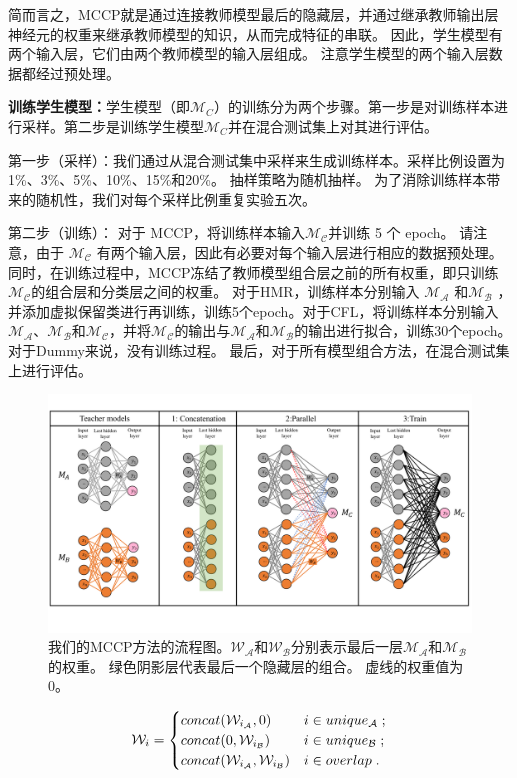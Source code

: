 \documentclass[fontset=macnew,UTF8]{article} %
\begin{document}
简而言之，MCCP就是通过连接教师模型最后的隐藏层，并通过继承教师输出层神经元的权重来继承教师模型的知识，从而完成特征的串联。 因此，学生模型有两个输入层，它们由两个教师模型的输入层组成。 注意学生模型的两个输入层数据都经过预处理。

\textbf{训练学生模型：}学生模型（即$\mathcal{M}_C$）的训练分为两个步骤。第一步是对训练样本进行采样。第二步是训练学生模型$\mathcal{M}_C$并在混合测试集上对其进行评估。

第一步（采样）：我们通过从混合测试集中采样来生成训练样本。采样比例设置为1\%、3\%、5\%、10\%、15\%和20\%\cite{shen2020multiple}。 抽样策略为随机抽样。 为了消除训练样本带来的随机性，我们对每个采样比例重复实验五次。

第二步（训练）： 对于 MCCP，将训练样本输入$\mathcal{M_C}$并训练 5 个 epoch。 请注意，由于 $\mathcal{M_C}$ 有两个输入层，因此有必要对每个输入层进行相应的数据预处理。 同时，在训练过程中，MCCP冻结了教师模型组合层之前的所有权重，即只训练$\mathcal{M_C}$的组合层和分类层之间的权重。 对于HMR，训练样本分别输入 $\mathcal{M_A}$ 和$\mathcal{M_B}$ ，并添加虚拟保留类进行再训练，训练5个epoch。对于CFL，将训练样本分别输入$\mathcal{M_A}$、$\mathcal{M_B}$和$\mathcal{M_C}$，并将$\mathcal{M_C}$的输出与$\mathcal{M_A}$和$\mathcal{M_B}$的输出进行拟合，训练30个epoch。 对于Dummy来说，没有训练过程。 最后，对于所有模型组合方法，在混合测试集上进行评估。
\begin{figure}[t]
	\centering
	\includegraphics[scale=0.4]{MCCP_method.pdf}
	\caption{我们的MCCP方法的流程图。$\mathcal{W_A}$和$\mathcal{W_B}$分别表示最后一层$\mathcal{M_A}$和$\mathcal{M_B}$的权重。 绿色阴影层代表最后一个隐藏层的组合。 虚线的权重值为 0。}	
	\label{MCCP_method}
\end{figure}

\begin{equation}
	\label{weightFormula}
	\mathcal{W}_i = 
	\begin{cases}
		\hfil concat(\mathcal{W}_{i_\mathcal{A}},0) &  i \in unique_\mathcal{A} \;;\\
		\hfil concat(0,\mathcal{W}_{i_\mathcal{B}}) &  i \in unique_\mathcal{B} \;;\\
		concat(\mathcal{W}_{i_\mathcal{A}},\mathcal{W}_{i_\mathcal{B}}) &  i \in overlap \;.
	\end{cases}
\end{equation}
\end{document}
